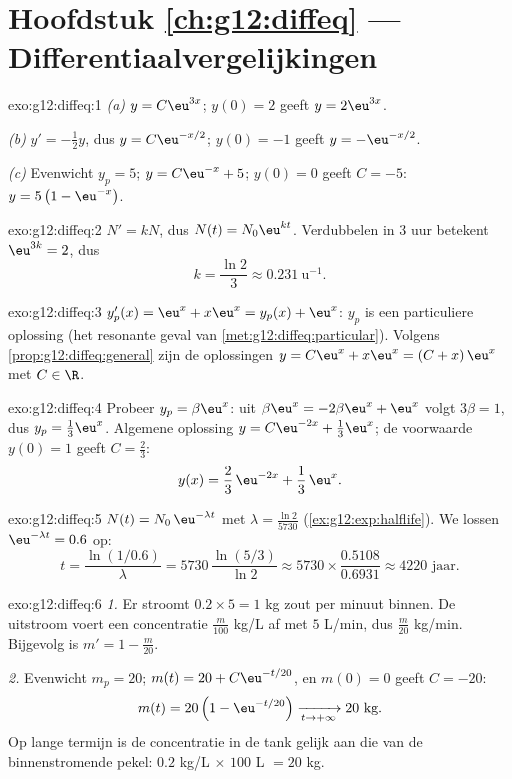 \section*{Hoofdstuk \ref{ch:g12:diffeq} --- Differentiaalvergelijkingen}

\begin{solution}{exo:g12:diffeq:1}
\emph{(a)} $y = C\eu^{3x}$; $y(0) = 2$ geeft $y = 2\eu^{3x}$.

\emph{(b)} $y' = -\frac12 y$, dus $y = C\eu^{-x/2}$; $y(0) = -1$ geeft
$y = -\eu^{-x/2}$.

\emph{(c)} Evenwicht $y_p = 5$; $y = C\eu^{-x} + 5$; $y(0) = 0$ geeft
$C = -5$: $y = 5\left(1 - \eu^{-x}\right)$.
\end{solution}

\begin{solution}{exo:g12:diffeq:2}
$N' = kN$, dus $N(t) = N_0 \eu^{kt}$. Verdubbelen in $3$ uur betekent
$\eu^{3k} = 2$, dus
\[
k = \frac{\ln 2}{3} \approx 0.231\ \text{u}^{-1}.
\]
\end{solution}

\begin{solution}{exo:g12:diffeq:3}
$y_p'(x) = \eu^x + x\eu^x = y_p(x) + \eu^x$: $y_p$ is een particuliere
oplossing (het resonante geval van \cref{met:g12:diffeq:particular}). Volgens
\cref{prop:g12:diffeq:general} zijn de oplossingen
$y = C\eu^{x} + x\eu^{x} = (C + x)\,\eu^x$ met $C \in \R$.
\end{solution}

\begin{solution}{exo:g12:diffeq:4}
Probeer $y_p = \beta\eu^x$: uit $\beta\eu^x = -2\beta\eu^x + \eu^x$ volgt
$3\beta = 1$, dus $y_p = \frac13\eu^x$. Algemene oplossing
$y = C\eu^{-2x} + \frac13\eu^{x}$; de voorwaarde $y(0) = 1$ geeft
$C = \frac23$:
\[
y(x) = \frac{2}{3}\,\eu^{-2x} + \frac{1}{3}\,\eu^{x}.
\]
\end{solution}

\begin{solution}{exo:g12:diffeq:5}
$N(t) = N_0\,\eu^{-\lambda t}$ met $\lambda = \frac{\ln 2}{5730}$
(\cref{ex:g12:exp:halflife}). We lossen $\eu^{-\lambda t} = 0.6$ op:
\[
t = \frac{\ln(1/0.6)}{\lambda} = 5730\,\frac{\ln(5/3)}{\ln 2}
\approx 5730 \times \frac{0.5108}{0.6931} \approx 4220 \text{ jaar}.
\]
\end{solution}

\begin{solution}{exo:g12:diffeq:6}
\emph{1.} Er stroomt $0.2 \times 5 = 1$ kg zout per minuut binnen. De
uitstroom voert een concentratie $\frac{m}{100}$ kg/L af met $5$ L/min, dus
$\frac{m}{20}$ kg/min. Bijgevolg is $m' = 1 - \frac{m}{20}$.

\emph{2.} Evenwicht $m_p = 20$; $m(t) = 20 + C\eu^{-t/20}$, en $m(0) = 0$
geeft $C = -20$:
\[
m(t) = 20\left(1 - \eu^{-t/20}\right) \xrightarrow[t\to+\infty]{} 20 \text{ kg}.
\]
Op lange termijn is de concentratie in de tank gelijk aan die van de
binnenstromende pekel: $0.2$ kg/L $\times$ $100$ L $= 20$ kg.
\end{solution}


